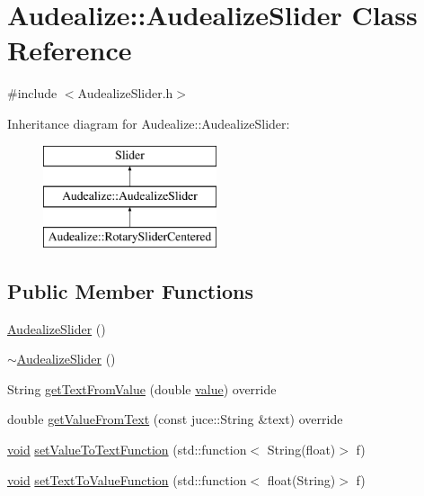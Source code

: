 \hypertarget{class_audealize_1_1_audealize_slider}{}\section{Audealize\+:\+:Audealize\+Slider Class Reference}
\label{class_audealize_1_1_audealize_slider}


{\ttfamily \#include $<$Audealize\+Slider.\+h$>$}

Inheritance diagram for Audealize\+:\+:Audealize\+Slider\+:\begin{figure}[H]
\begin{center}
\leavevmode
\includegraphics[height=3.000000cm]{class_audealize_1_1_audealize_slider}
\end{center}
\end{figure}
\subsection*{Public Member Functions}
\begin{DoxyCompactItemize}
\item 
\hyperlink{class_audealize_1_1_audealize_slider_a9f5d47d4aef86ee8ea80d12bd85fd75f}{Audealize\+Slider} ()
\item 
\hyperlink{class_audealize_1_1_audealize_slider_a6658b7093118d4412236c877dd92274d}{$\sim$\+Audealize\+Slider} ()
\item 
String \hyperlink{class_audealize_1_1_audealize_slider_ad878601b8f7fee2b4715d8863c0fb2c8}{get\+Text\+From\+Value} (double \hyperlink{tk_8h_a177a0765f574ef6642002696d9cd82d0}{value}) override
\item 
double \hyperlink{class_audealize_1_1_audealize_slider_a361a1e00ca8ef5efdedf24a624d3b683}{get\+Value\+From\+Text} (const juce\+::\+String \&text) override
\item 
\hyperlink{tk_8h_aba408b7cd755a96426e004c015f5de8e}{void} \hyperlink{class_audealize_1_1_audealize_slider_a70ec585c217aafd7a1a7d8d584bf33b1}{set\+Value\+To\+Text\+Function} (std\+::function$<$ String(float)$>$ f)
\item 
\hyperlink{tk_8h_aba408b7cd755a96426e004c015f5de8e}{void} \hyperlink{class_audealize_1_1_audealize_slider_a9211015084c99898254ec989251712aa}{set\+Text\+To\+Value\+Function} (std\+::function$<$ float(String)$>$ f)
\end{DoxyCompactItemize}


